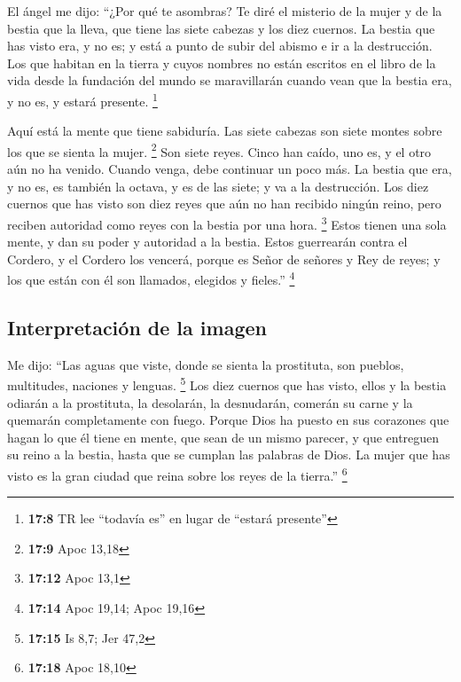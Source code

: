 \begin{paracol}{2}
 El ángel me dijo: ``¿Por qué te asombras? Te diré el
misterio de la mujer y de la bestia que la lleva, que tiene las siete
cabezas y los diez cuernos.  La bestia que has visto era,
y no es; y está a punto de subir del abismo e ir a la destrucción. Los
que habitan en la tierra y cuyos nombres no están escritos en el libro
de la vida desde la fundación del mundo se maravillarán cuando vean que
la bestia era, y no es, y estará presente. \footnote{\textbf{17:8} TR
  lee ``todavía es'' en lugar de ``estará presente''}

 Aquí está la mente que tiene sabiduría. Las siete cabezas
son siete montes sobre los que se sienta la mujer. \footnote{\textbf{17:9}
  Apoc 13,18}  Son siete reyes. Cinco han caído, uno es,
y el otro aún no ha venido. Cuando venga, debe continuar un poco más.
 La bestia que era, y no es, es también la octava, y es
de las siete; y va a la destrucción.  Los diez cuernos
que has visto son diez reyes que aún no han recibido ningún reino, pero
reciben autoridad como reyes con la bestia por una hora. \footnote{\textbf{17:12}
  Apoc 13,1}  Estos tienen una sola mente, y dan su poder
y autoridad a la bestia.  Estos guerrearán contra el
Cordero, y el Cordero los vencerá, porque es Señor de señores y Rey de
reyes; y los que están con él son llamados, elegidos y fieles.''
\footnote{\textbf{17:14} Apoc 19,14; Apoc 19,16}

\hypertarget{interpretaciuxf3n-de-la-imagen}{%
\subsection{Interpretación de la
imagen}\label{interpretaciuxf3n-de-la-imagen}}

 Me dijo: ``Las aguas que viste, donde se sienta la
prostituta, son pueblos, multitudes, naciones y lenguas. \footnote{\textbf{17:15}
  Is 8,7; Jer 47,2}  Los diez cuernos que has visto,
ellos y la bestia odiarán a la prostituta, la desolarán, la desnudarán,
comerán su carne y la quemarán completamente con fuego. 
Porque Dios ha puesto en sus corazones que hagan lo que él tiene en
mente, que sean de un mismo parecer, y que entreguen su reino a la
bestia, hasta que se cumplan las palabras de Dios.  La
mujer que has visto es la gran ciudad que reina sobre los reyes de la
tierra.'' \footnote{\textbf{17:18} Apoc 18,10}

\switchcolumn
\begin{otherlanguage}{english}


\end{otherlanguage}
\end{paracol}
